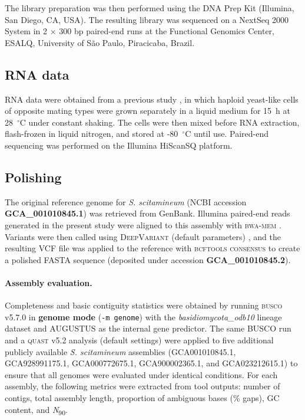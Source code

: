 \documentclass[Journal,letterpaper]{ascelike-new}
\begin{document}
The library preparation was then performed using the DNA Prep Kit (Illumina, San Diego, CA, USA). The resulting library was sequenced on a NextSeq 2000 System in 2 $\times$ 300 bp paired-end runs at the Functional Genomics Center, ESALQ, University of São Paulo, Piracicaba, Brazil.

\subsection*{RNA data}

RNA data were obtained from a previous study \cite{sscita2015}, in which haploid yeast-like cells of opposite mating types were grown separately in a liquid medium for 15~h at 28~$^{\circ}$C under constant shaking. The cells were then mixed before RNA extraction, flash-frozen in liquid nitrogen, and stored at -80~$^{\circ}$C until use. Paired-end sequencing was performed on the Illumina HiScanSQ platform.

\subsection*{Polishing}

The original reference genome for \textit{S. scitamineum} (NCBI accession \textbf{GCA\_001010845.1}) \cite{sscita2015} was retrieved from GenBank. Illumina paired-end reads generated in the present study were aligned to this assembly with \textsc{bwa-mem} \cite{bwamem}. Variants were then called using \textsc{DeepVariant} (default parameters) \cite{deepvariant2018}, and the resulting VCF file was applied to the reference with \textsc{bcftools consensus} \cite{samtools} to create a polished FASTA sequence (deposited under accession \textbf{GCA\_001010845.2}).

\paragraph{Assembly evaluation.} Completeness and basic contiguity statistics were obtained by running \textsc{busco} v5.7.0 \cite{busco} in \textbf{genome mode} (\texttt{-m genome}) with the \textit{basidiomycota\_odb10} lineage dataset and \textsc{AUGUSTUS} as the internal gene predictor. The same BUSCO run and a \textsc{quast} v5.2 analysis (default settings) were applied to five additional publicly available \textit{S. scitamineum} assemblies (GCA001010845.1, GCA928991175.1, GCA000772675.1, GCA900002365.1, and GCA023212615.1) to ensure that all genomes were evaluated under identical conditions. For each assembly, the following metrics were extracted from tool outputs: number of contigs, total assembly length, proportion of ambiguous bases (\% gaps), GC content, and \textit{N}\textsubscript{90}.
\end{document}
